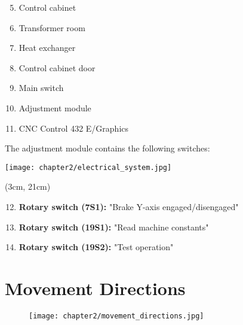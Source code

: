 \begin{minipage}[c]{0.45\textwidth}
    \begin{enumerate}[itemsep=1pt,parsep=0pt]
        \setcounter{enumi}{4}
        \item Control cabinet
        \item Transformer room
        \item Heat exchanger
        \item Control cabinet door
        \item Main switch
        \item Adjustment module
        \item CNC Control 432 E/Graphics
    \end{enumerate}

    The adjustment module contains the following switches:
\end{minipage}%
\begin{minipage}{0.6\textwidth}
    \centering
    \texttt{[image: chapter2/electrical\_system.jpg]}
    \label{fig:electrical_system}
\end{minipage}

\begin{textblock*}{\textwidth}(3cm, 21cm)  %
    \begin{enumerate}[itemsep=1pt,parsep=0pt]
        \setcounter{enumi}{11}
        \item \textbf{Rotary switch (7S1):} "Brake Y-axis engaged/disengaged"
        \item \textbf{Rotary switch (19S1):} "Read machine constants"
        \item \textbf{Rotary switch (19S2):} "Test operation"
    \end{enumerate}
\end{textblock*}

\vspace{2cm}


\section{Movement Directions}

\begin{figure}[h]
    \centering
    \texttt{[image: chapter2/movement\_directions.jpg]}
\end{figure}

